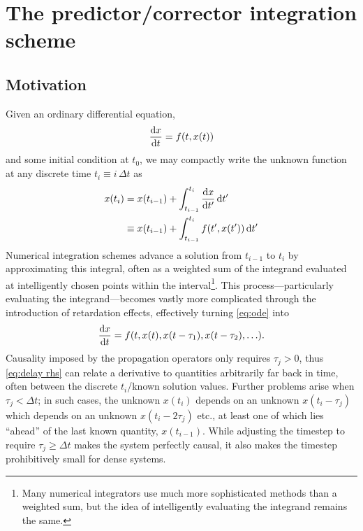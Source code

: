 \chapter{\label{appendix:predictor corrector}The predictor/corrector integration scheme}

\section{Motivation}

Given an ordinary differential equation,
\begin{equation}
  \dv{x}{t} = f(t, x(t))
  \label{eq:ode}
\end{equation}
and some initial condition at $t_0$, we may compactly write the unknown function at any discrete time $t_i \equiv i\,\Delta t$ as
\begin{equation}
  \begin{aligned}
    x(t_i) & = x(t_{i-1}) + \int_{t_{i-1}}^{t_i} \dv{x}{t'} \dd{t'} \\
    &                 \equiv x(t_{i-1}) + \int_{t_{i-1}}^{t_i} f(t', x(t')) \dd{t'}
    \label{eq:ode step}
  \end{aligned}
\end{equation}
Numerical integration schemes advance a solution from $t_{i-1}$ to $t_i$ by approximating this integral, often as a weighted sum of the integrand evaluated at intelligently chosen points within the interval\footnote{Many numerical integrators use much more sophisticated methods than a weighted sum, but the idea of intelligently evaluating the integrand remains the same.}.
This process---particularly evaluating the integrand---becomes vastly more complicated through the introduction of retardation effects, effectively turning \cref{eq:ode} into
\begin{equation}
  \dv{x}{t} = f(t, x(t), x(t - \tau_1), x(t - \tau_2), \ldots).
  \label{eq:delay rhs}
\end{equation}
Causality imposed by the propagation operators only requires $\tau_j > 0$, thus \cref{eq:delay rhs} can relate a derivative to quantities arbitrarily far back in time, often between the discrete $t_i$/known solution values.
Further problems arise when $\tau_j < \Delta t$; in such cases, the unknown $x(t_i)$ depends on an unknown $x(t_i - \tau_j)$ which depends on an unknown $x(t_i - 2 \tau_j)$ etc., at least one of which lies ``ahead'' of the last known quantity, $x(t_{i-1})$.
While adjusting the timestep to require $\tau_j \geqslant \Delta t$ makes the system perfectly causal, it also makes the timestep prohibitively small for dense systems.
